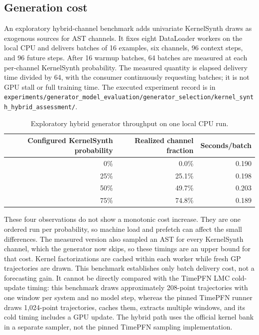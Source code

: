\subsection{Generation cost}
\label{sec:multivariate-generation-results}
An exploratory hybrid-channel benchmark adds univariate KernelSynth draws as
exogenous sources for AST channels. It fixes eight DataLoader workers on the
local CPU and delivers batches of 16 examples, six channels, 96 context steps,
and 96 future steps. After 16 warmup batches, 64 batches are measured at each
per-channel KernelSynth probability. The measured quantity is elapsed delivery
time divided by 64, with the consumer continuously requesting batches; it is
not GPU stall or full training time. The executed experiment record is in
\texttt{experiments/generator\_model\_evaluation/generator\_selection/kernel\_synth\_hybrid\_assessment/}.
\begin{table}[htbp]\centering
\caption{Exploratory hybrid generator throughput on one local CPU run.}
\label{tab:hybrid-kernelsynth-throughput}
\begin{tabular}{rrr}\hline
Configured KernelSynth probability & Realized channel fraction & Seconds/batch \\\hline
0\% & 0.0\% & 0.190 \\
25\% & 25.1\% & 0.198 \\
50\% & 49.7\% & 0.203 \\
75\% & 74.8\% & 0.189 \\\hline
\end{tabular}\end{table}
These four observations do not show a monotonic cost increase. They are one
ordered run per probability, so machine load and prefetch can affect the small
differences. The measured version also sampled an AST for every KernelSynth
channel, which the generator now skips, so these timings are an upper bound for
that cost. Kernel factorizations are cached within each worker while fresh GP
trajectories are drawn. This benchmark establishes only batch delivery cost,
not a forecasting gain.
It cannot be directly compared with the TimePFN LMC cold-update timing:
this benchmark draws approximately 208-point trajectories with one window per
system and no model step, whereas the pinned TimePFN runner draws 1,024-point
trajectories, caches them, extracts multiple windows, and its cold timing
includes a GPU update. The hybrid path uses the official kernel bank in a
separate sampler, not the pinned TimePFN sampling implementation.

